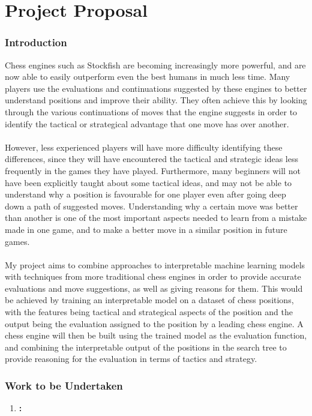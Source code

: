 \documentclass[10pt,a4paper]{article}
\begin{document}
\part*{Project Proposal}
\section*{Introduction}
Chess engines such as Stockfish are becoming increasingly more powerful, and are now able to easily outperform even the best humans in much less time. Many players use the evaluations and continuations suggested by these engines to better understand positions and improve their ability. They often achieve this by looking through the various continuations of moves that the engine suggests in order to identify the tactical or strategical advantage that one move has over another.
\\\\
However, less experienced players will have more difficulty identifying these differences, since they will have encountered the tactical and strategic ideas less frequently in the games they have played. Furthermore, many beginners will not have been explicitly taught about some tactical ideas, and may not be able to understand why a position is favourable for one player even after going deep down a path of suggested moves. Understanding why a certain move was better than another is one of the most important aspects needed to learn from a mistake made in one game, and to make a better move in a similar position in future games.
\\\\
My project aims to combine approaches to interpretable machine learning models with techniques from more traditional chess engines in order to provide accurate evaluations and move suggestions, as well as giving reasons for them. This would be achieved by training an interpretable model on a dataset of chess positions, with the features being tactical and strategical aspects of the position and the output being the evaluation assigned to the position by a leading chess engine. A chess engine will then be built using the trained model as the evaluation function, and combining the interpretable output of the positions in the search tree to provide reasoning for the evaluation in terms of tactics and strategy.

\section*{Work to be Undertaken}
\begin{enumerate}
    \item \textbf{:}
    \\
\end{enumerate}
\end{document}
